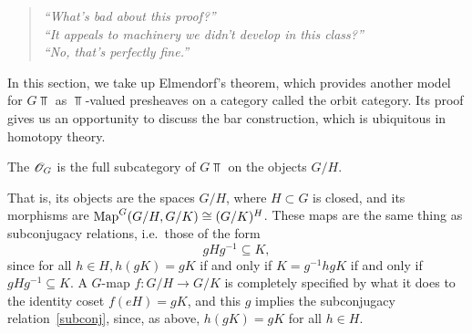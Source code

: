 
\begin{quote}\textit{
	``What's bad about this proof?''\\
	``It appeals to machinery we didn't develop in this class?''\\
	``No, that's perfectly fine.''
}\end{quote}

In this section, we take up Elmendorf's theorem, which provides another model for $G\Top$ as $\Top$-valued
presheaves on a category called the orbit category. Its proof gives us an opportunity to discuss the bar
construction, which is ubiquitous in homotopy theory.
\begin{defn}
The  $\mathscr O_G$ is the full subcategory of $G\Top$ on the objects $G/H$.
\end{defn}
That is, its objects are the spaces $G/H$, where $H\subset G$ is closed, and its morphisms are $\operatorname{Map}^G(G/H,
G/K)\cong (G/K)^H$. These maps are the same thing as subconjugacy relations, i.e.\ those of the form
\begin{equation}
\label{subconj}
gHg^{-1}\subseteq K,
\end{equation}
since for all $h \in H, h(gK) = gK$ if and only if $K = g^{-1}hgK$ if and only if $gHg^{-1} \subseteq K$.  A
$G$-map $f\colon G/H\to G/K$ is completely specified by what it does to the identity coset $f(eH) = gK$, and this
$g$ implies the subconjugacy relation~\eqref{subconj}, since, as above, $h(gK) = gK$ for all $h \in
H$.

